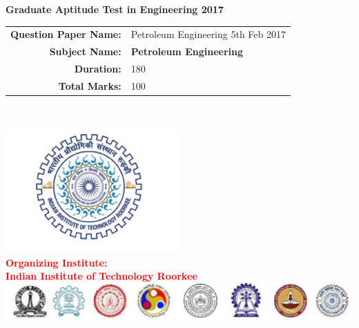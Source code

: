 \documentclass[journal,12pt,onecolumn]{article}
\begin{document}
\begin{center}
    \textbf{\huge Graduate Aptitude Test in Engineering 2017}\\[2cm]
{
\Large

    \begin{tabular}{rl}
        \textbf{Question Paper Name:} & Petroleum Engineering 5th Feb 2017 \\
        \textbf{Subject Name:} & \textbf{Petroleum Engineering} \\
        \textbf{Duration:} & 180 \\
        \textbf{Total Marks:} & 100 \\
    \end{tabular}\\[3cm]
}
    \includegraphics[width=0.5\textwidth]{Figs/IITRoorkee.png}\\[2cm]

    {\textcolor{red}{ \Large \textbf{\Huge{Organizing Institute:}}}}\\[0.5em]
    {\textcolor{red}{ \LARGE \textbf{\huge{Indian Institute of Technology Roorkee}}}}\\[2cm]

    \includegraphics[width=\textwidth]{Figs/alliits.png}
\end{center}

\thispagestyle{empty}

\newpage
\end{document}
